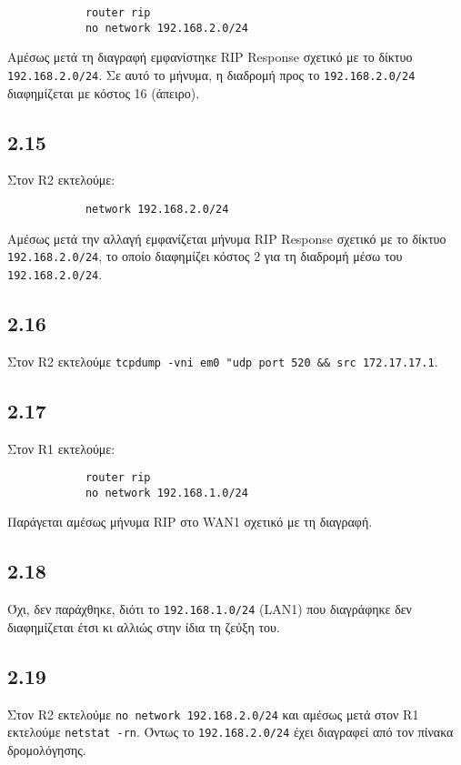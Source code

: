 \documentclass[a4paper, 12pt]{article}
\begin{document}
		\begin{verbatim}
			router rip
			no network 192.168.2.0/24
		\end{verbatim} 
		
		Αμέσως μετά τη διαγραφή εμφανίστηκε RIP Response σχετικό με το δίκτυο \verb|192.168.2.0/24|. Σε αυτό το μήνυμα, η διαδρομή προς το \verb|192.168.2.0/24| διαφημίζεται με κόστος 16 (άπειρο).

	\subsection*{2.15}
		Στον R2 εκτελούμε:
		
		\begin{verbatim}
			network 192.168.2.0/24
		\end{verbatim}
		
		Αμέσως μετά την αλλαγή εμφανίζεται μήνυμα RIP Response σχετικό με το δίκτυο \verb|192.168.2.0/24|, το οποίο διαφημίζει κόστος 2 για τη διαδρομή μέσω του \verb|192.168.2.0/24|.

	\subsection*{2.16}
		Στον R2 εκτελούμε \verb|tcpdump -vni em0 "udp port 520 && src 172.17.17.1|.

	\subsection*{2.17}
		Στον R1 εκτελούμε:
		
		\begin{verbatim}
			router rip
			no network 192.168.1.0/24
		\end{verbatim}
		
		Παράγεται αμέσως μήνυμα RIP στο WAN1 σχετικό με τη διαγραφή.
		
	\subsection*{2.18} 
		Όχι, δεν παράχθηκε, διότι το \verb|192.168.1.0/24| (LAN1) που διαγράφηκε δεν διαφημίζεται έτσι κι αλλιώς στην ίδια τη ζεύξη του.

	\subsection*{2.19}
		Στον R2 εκτελούμε \verb|no network 192.168.2.0/24| και αμέσως μετά στον R1 εκτελούμε \verb|netstat -rn|. Όντως το \verb|192.168.2.0/24| έχει διαγραφεί από τον πίνακα δρομολόγησης.
\end{document}
